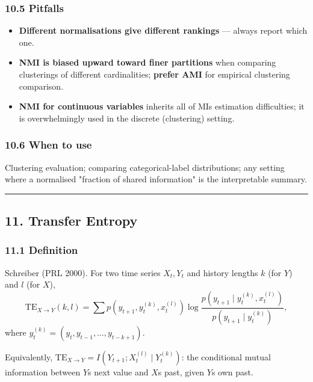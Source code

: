 \documentclass{article}
\providecommand{\tightlist}{\setlength{\itemsep}{0pt}\setlength{\parskip}{0pt}}
\begin{document}
\subsubsection{10.5 Pitfalls}\label{105-pitfalls}

\begin{itemize}
\tightlist
\item
  \textbf{Different normalisations give different rankings} --- always
  report which one.
\item
  \textbf{NMI is biased upward toward finer partitions} when comparing
  clusterings of different cardinalities; \textbf{prefer AMI} for
  empirical clustering comparison.
\item
  \textbf{NMI for continuous variables} inherits all of
  MI\textquotesingle s estimation difficulties; it is overwhelmingly
  used in the discrete (clustering) setting.
\end{itemize}

\subsubsection{10.6 When to use}\label{106-when-to-use}

Clustering evaluation; comparing categorical-label distributions; any
setting where a normalised "fraction of shared information" is the
interpretable summary.

\begin{center}\rule{0.5\linewidth}{0.5pt}\end{center}

\subsection{11. Transfer Entropy}\label{11-transfer-entropy}

\subsubsection{11.1 Definition}\label{111-definition}

Schreiber (PRL 2000). For two time series \(X_t, Y_t\) and history
lengths \(k\) (for \(Y\)) and \(l\) (for \(X\)), \[
\mathrm{TE}_{X \to Y}(k, l) = \sum p(y_{t+1}, y_t^{(k)}, x_t^{(l)}) \log \frac{p(y_{t+1} \mid y_t^{(k)}, x_t^{(l)})}{p(y_{t+1} \mid y_t^{(k)})},
\] where \(y_t^{(k)} = (y_t, y_{t-1}, \dots, y_{t-k+1})\).

Equivalently,
\(\mathrm{TE}_{X \to Y} = I(Y_{t+1}; X_t^{(l)} \mid Y_t^{(k)})\): the
conditional mutual information between \(Y\)\textquotesingle s next
value and \(X\)\textquotesingle s past, given \(Y\)\textquotesingle s
own past.
\end{document}
